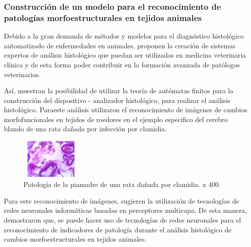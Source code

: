 \documentclass[10pt,conference]{IEEEtran}
\begin{document}
\subsubsection{\textbf{Construcción de un modelo para el reconocimiento de patologías morfoestructurales en tejidos animales}}
Debido a la gran demanda de métodos y modelos para el diagnóstico histológico automatizado de enfermedades en animales,  proponen la creación de sistemas expertos de análisis histológico que puedan ser utilizados en medicina veterinaria clínica y de esta forma poder contribuir en la formación avanzada de patólogos veterinarios.\par
Así, muestran la posibilidad de utilizar la teoría de autómatas finitos para la construcción del dispositivo - analizador histológico, para realizar el análisis histológico. Paraeste análisis utilizaron el reconocimiento de imágenes de cambios morfofuncionales en tejidos de roedores en el ejemplo especifico del cerebro blando de una rata dañada por infección por clamidia. 
\begin{figure}[H]
 \begin{center}
       \includegraphics[width=
       3cm, height=2cm]{Ind. Ambiental/4.JPG}
      \caption{Patología de la piamadre de una rata dañada por clamidia. x 400.}
      \label{Amb-4} 
      \end{center}
\end{figure}
Para este reconocimiento de imágenes,  sugieren la utilización de tecnologías de redes neuronales informáticas basadas en perceptores multicapa. De esta manera, demostraron que, se puede hacer uso de tecnologías de redes neuronales para el reconocimiento de indicadores de patología durante el análisis histológico de cambios morfoestructurales en tejidos animales.

\vspace{2.5mm}
\end{document}
